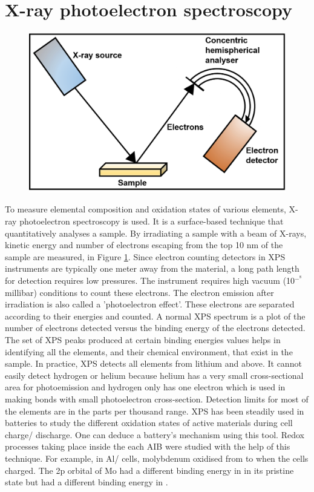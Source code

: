 \section{X-ray photoelectron spectroscopy}
\begin{figure}[tbh!]
\centering
\includegraphics[width=\textwidth]{Figures/XPS}
\caption{}
\label{Figures:XPS}
\end{figure}
To measure elemental composition and oxidation states of various elements, X-ray photoelectron spectroscopy is used. It is a surface-based technique that quantitatively analyses a sample. By irradiating a sample with a beam of X-rays, kinetic energy and number of electrons escaping from the top 10 nm of the sample are measured, in Figure \ref{Figures:XPS}. Since  electron counting detectors in XPS instruments are typically one meter away from the material, a long path length for detection requires low pressures. The instrument requires high vacuum (10$^−^8$ millibar) conditions to count these electrons. The electron emission after irradiation is also called a 'photoelectron effect'. These electrons are separated according to their energies and counted. A normal XPS spectrum is a plot of the number of electrons detected versus the binding energy of the electrons detected. The set of XPS peaks produced at certain binding energies values helps in identifying all the elements, and their chemical environment, that exist in the sample. In practice, XPS detects all elements from lithium and above. It cannot easily detect hydrogen or helium because helium has a very small cross-sectional area for photoemission and hydrogen only has one electron which is used in making bonds with  small photoelectron cross-section. Detection limits for most of the elements are in the parts per thousand range. XPS has been steadily used in batteries to study the different oxidation states of active materials during cell charge/ discharge. One can deduce a battery's mechanism using this tool.
Redox processes taking place inside the each AIB were studied with the help of this technique. For example, in Al/ cells, molybdenum oxidised from  to  when the cells charged. The 2p orbital of Mo had a different binding energy in  in its pristine state but had a different binding energy in . 
